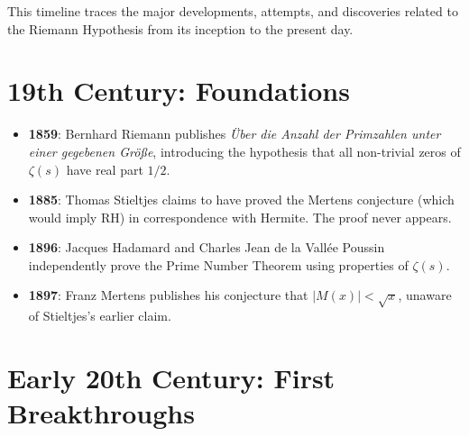 
This timeline traces the major developments, attempts, and discoveries related to the Riemann Hypothesis from its inception to the present day.

\section*{19th Century: Foundations}

\begin{itemize}
\item \textbf{1859}: Bernhard Riemann publishes \emph{\"Uber die Anzahl der Primzahlen unter einer gegebenen Gr\"o{\ss}e}, introducing the hypothesis that all non-trivial zeros of $\zeta(s)$ have real part $1/2$.

\item \textbf{1885}: Thomas Stieltjes claims to have proved the Mertens conjecture (which would imply RH) in correspondence with Hermite. The proof never appears.

\item \textbf{1896}: Jacques Hadamard and Charles Jean de la Vall\'ee Poussin independently prove the Prime Number Theorem using properties of $\zeta(s)$.

\item \textbf{1897}: Franz Mertens publishes his conjecture that $|M(x)| < \sqrt{x}$, unaware of Stieltjes's earlier claim.
\end{itemize}

\section*{Early 20th Century: First Breakthroughs}

